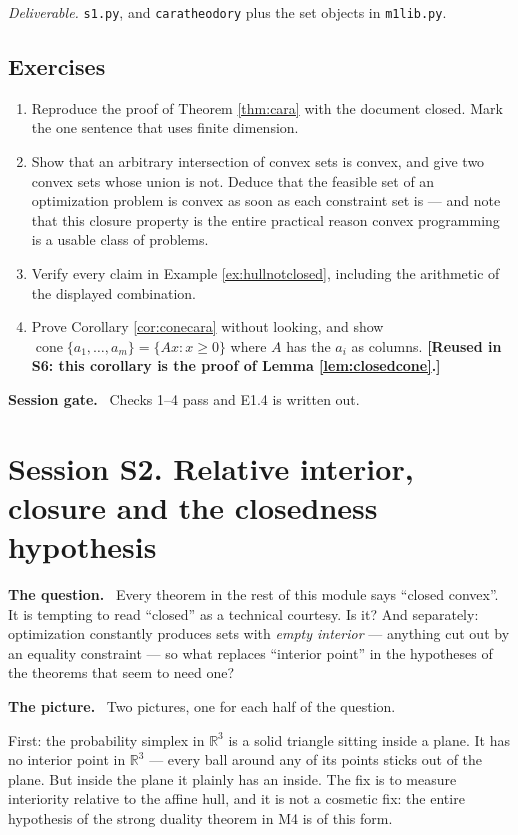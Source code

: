 \documentclass[11pt,a4paper]{article}
\newcommand{\mpart}[1]{\smallskip\noindent\textbf{#1}\ \ignorespaces}
\theoremstyle{definition}
\theoremstyle{plain}
\theoremstyle{remark}
\newcommand{\R}{\mathbb{R}}
\DeclareMathOperator{\cone}{cone}
\begin{document}
\emph{Deliverable.} \texttt{s1.py}, and \texttt{caratheodory} plus the set objects in
\texttt{m1lib.py}.

\subsection*{Exercises}
\begin{enumerate}[label=E1.\arabic*]
\item Reproduce the proof of Theorem \ref{thm:cara} with the document closed. Mark the one
sentence that uses finite dimension.
\item Show that an arbitrary intersection of convex sets is convex, and give two convex sets
whose union is not. Deduce that the feasible set of an optimization problem is convex as soon
as each constraint set is --- and note that this closure property is the entire practical
reason convex programming is a usable class of problems.
\item Verify every claim in Example \ref{ex:hullnotclosed}, including the arithmetic of the
displayed combination.
\item Prove Corollary \ref{cor:conecara} without looking, and show
$\cone\{a_1,\dots,a_m\}=\{Ax:x\ge0\}$ where $A$ has the $a_i$ as columns. \textbf{[Reused in
S6: this corollary is the proof of Lemma \ref{lem:closedcone}.]}
\end{enumerate}

\mpart{Session gate.} Checks 1--4 pass and E1.4 is written out.

\clearpage

\section{Session S2. Relative interior, closure and the closedness hypothesis}

\mpart{The question.} Every theorem in the rest of this module says ``closed convex''. It is
tempting to read ``closed'' as a technical courtesy. Is it? And separately: optimization
constantly produces sets with \emph{empty interior} --- anything cut out by an equality
constraint --- so what replaces ``interior point'' in the hypotheses of the theorems that seem
to need one?

\mpart{The picture.} Two pictures, one for each half of the question.

First: the probability simplex in $\R^3$ is a solid triangle sitting inside a plane. It has no
interior point in $\R^3$ --- every ball around any of its points sticks out of the plane. But
inside the plane it plainly has an inside. The fix is to measure interiority relative to the
affine hull, and it is not a cosmetic fix: the entire hypothesis of the strong duality theorem
in M4 is of this form.
\end{document}
